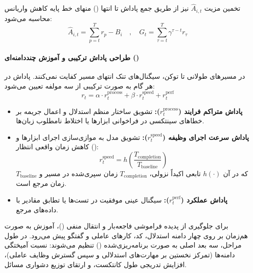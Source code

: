 تخمین مزیت $\hat{A}_{i,t}$ نیز از طریق جمع پاداش تا انتها () منهای خط پایه کاهش واریانس محاسبه می‌شود:
\begin{equation}
    \hat{A}_{i,t} = \sum_{p=t}^T r_p - B_i \quad , \quad G_t = \sum_{\tau=t}^T \gamma^{\tau - t} r_\tau
\end{equation}

\paragraph*{طراحی پاداش ترکیبی و آموزش چنددامنه‌ای ()}
در مسیرهای طولانی تا  توکن، سیگنال‌های تنک انتهای مسیر کفایت نمی‌کنند. پاداش در هر گام به صورت ترکیبی از سه مولفه تعیین می‌شود:
\begin{equation}
    r_t = \alpha \cdot r_t^{\text{process}} + \beta \cdot r_t^{\text{speed}} + r_t^{\text{perf}}
\end{equation}
\begin{itemize}
    \item \textbf{پاداش متراکم فرایند ($r_t^{\text{process}}$):} تشویق ساختار منظم استدلال و اعمال جریمه بر خطاهای سینتکسی در فراخوانی ابزارها یا اختلاط نامطلوب زبان‌ها.
    \item \textbf{پاداش سرعت اجرای وظیفه ($r_t^{\text{speed}}$):} تشویق مدل به موازی‌سازی اجرای ابزارها و کاهش زمان واقعی انتظار ():
    \begin{equation}
        r_t^{\text{speed}} = h\left( \frac{T_{\text{completion}}}{T_{\text{baseline}}} \right)
    \end{equation}
    که در آن $h(\cdot)$ تابعی اکیداً نزولی، $T_{\text{completion}}$ زمان سپری‌شده در مسیر و $T_{\text{baseline}}$ زمان مرجع است.
    \item \textbf{پاداش عملکرد ($r_t^{\text{perf}}$):} سیگنال عینی موفقیت در تست‌ها یا تطابق مقادیر با داده‌های مرجع.
\end{itemize}
برای جلوگیری از پدیده فراموشی فاجعه‌بار و انتقال منفی ()، آموزش  به صورت هم‌زمان بر روی چهار دامنه استدلال، کد، کارهای عاملی و گفتگو پیش می‌رود. در طول مراحل، سه بعد اصلی به صورت برنامه‌ریزی‌شده () تنظیم می‌شوند: نسبت آمیختگی دامنه‌ها (تمرکز نخستین بر مهارت‌های استدلالی و سپس گسترش وظایف عاملی)، افزایش تدریجی طول کانتکست، و ارتقای توزیع دشواری مسائل.

